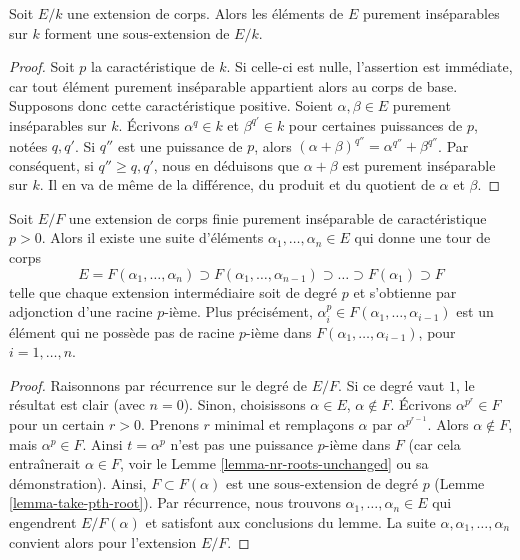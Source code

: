 \begin{lemma}
\label{lemma-purely-inseparable-elements}
Soit $E/k$ une extension de corps. Alors les éléments de $E$ purement inséparables
sur $k$ forment une sous-extension de $E/k$.
\end{lemma}

\begin{proof}
Soit $p$ la caractéristique de $k$.
Si celle-ci est nulle, l'assertion est immédiate, car tout élément purement
inséparable appartient alors au corps de base. Supposons donc cette caractéristique
positive.
Soient $\alpha, \beta \in E$ purement inséparables sur $k$. Écrivons
$\alpha^q \in k$ et $\beta^{q'} \in k$ pour certaines puissances de $p$, notées $q, q'$.
Si $q''$ est une puissance de $p$, alors
$(\alpha + \beta)^{q''} = \alpha^{q''} + \beta^{q''}$.
Par conséquent, si $q'' \geq q, q'$, nous en déduisons que $\alpha + \beta$
est purement inséparable sur $k$. Il en va de même de la différence,
du produit et du quotient de $\alpha$ et $\beta$.
\end{proof}

\begin{lemma}
\label{lemma-finite-purely-inseparable}
Soit $E/F$ une extension de corps finie purement inséparable de
caractéristique $p > 0$. Alors il existe une suite d'éléments
$\alpha_1, \ldots, \alpha_n \in E$ qui donne une tour
de corps
$$
E = F(\alpha_1, \ldots, \alpha_n) \supset
F(\alpha_1, \ldots, \alpha_{n - 1}) \supset
\ldots
\supset F(\alpha_1) \supset F
$$
telle que chaque extension intermédiaire soit de degré $p$ et s'obtienne
par adjonction d'une racine $p$-ième. Plus précisément,
$\alpha_i^p \in F(\alpha_1, \ldots, \alpha_{i - 1})$
est un élément qui ne possède pas de racine $p$-ième dans
$F(\alpha_1, \ldots, \alpha_{i - 1})$, pour $i = 1, \ldots, n$.
\end{lemma}

\begin{proof}
Raisonnons par récurrence sur le degré de $E/F$. Si ce degré vaut $1$,
le résultat est clair (avec $n = 0$). Sinon, choisissons
$\alpha \in E$, $\alpha \not \in F$. Écrivons $\alpha^{p^r} \in F$ pour un certain
$r > 0$. Prenons $r$ minimal et remplaçons $\alpha$ par $\alpha^{p^{r - 1}}$.
Alors $\alpha \not \in F$, mais $\alpha^p \in F$. Ainsi $t = \alpha^p$ n'est pas
une puissance $p$-ième dans $F$ (car cela entraînerait $\alpha \in F$, voir le
Lemme \ref{lemma-nr-roots-unchanged} ou sa démonstration).
Ainsi, $F \subset F(\alpha)$ est une sous-extension de degré $p$
(Lemme \ref{lemma-take-pth-root}). Par récurrence, nous trouvons
$\alpha_1, \ldots, \alpha_n \in E$ qui engendrent $E/F(\alpha)$
et satisfont aux conclusions du lemme.
La suite $\alpha, \alpha_1, \ldots, \alpha_n$ convient alors
pour l'extension $E/F$.
\end{proof}

